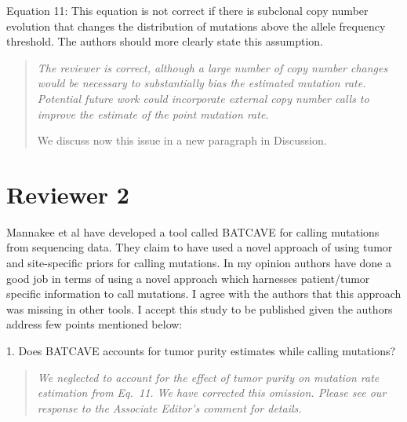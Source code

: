 \documentclass[11pt]{article}
\newenvironment{response}
{\begin{quote}\itshape}
{\end{quote}}
\begin{document}
Equation 11: This equation is not correct if there is subclonal copy number evolution that changes the distribution of mutations above the allele frequency threshold. The authors should more clearly state this assumption.
\begin{response}
The reviewer is correct, although a large number of copy number changes would be necessary to substantially bias the estimated mutation rate.
Potential future work could incorporate external copy number calls to improve the estimate of the point mutation rate.

We discuss now this issue in a new paragraph in Discussion.
\end{response}

\section*{Reviewer 2}

Mannakee et al have developed a tool called BATCAVE for calling mutations from sequencing data. They claim to have used a novel approach of using tumor and site-specific priors for calling mutations. In my opinion authors have done a good job in terms of using a novel approach which harnesses patient/tumor specific information to call mutations. I agree with the authors that this approach was missing in other tools. I accept this study to be published given the authors address few points mentioned below:

1. Does BATCAVE accounts for tumor purity estimates while calling mutations?
\begin{response}
We neglected to account for the effect of tumor purity on mutation rate estimation from Eq.~11.
We have corrected this omission.
Please see our response to the Associate Editor's comment for details.
\end{response}
\end{document}
